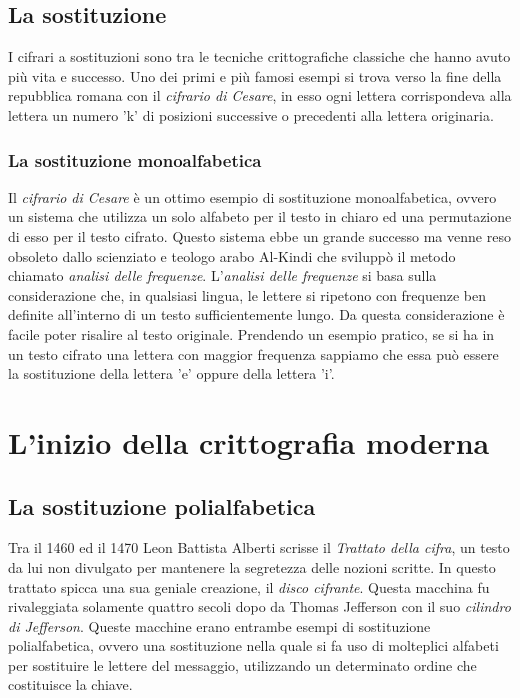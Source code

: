 \documentclass[a4paper, 12pt]{article}
\begin{document}
\subsection{La sostituzione}
I cifrari a sostituzioni sono tra le tecniche crittografiche classiche che hanno avuto più vita e successo. Uno dei primi e più famosi esempi si trova verso la fine della repubblica romana con il \textit{cifrario di Cesare}, in esso ogni lettera corrispondeva alla lettera un numero 'k' di posizioni successive o precedenti alla lettera originaria. 
\subsubsection{La sostituzione monoalfabetica}
Il \textit{cifrario di Cesare} è un ottimo esempio di sostituzione monoalfabetica, ovvero un sistema che utilizza un solo alfabeto per il testo in chiaro ed una permutazione di esso per il testo cifrato.\newline
Questo sistema ebbe un grande successo ma venne reso obsoleto dallo scienziato e teologo arabo Al-Kindi che sviluppò il metodo chiamato \textit{analisi delle frequenze}.\newline
L'\textit{analisi delle frequenze} si basa sulla considerazione che, in qualsiasi lingua, le lettere si ripetono con frequenze ben definite all'interno di un testo sufficientemente lungo. Da questa considerazione è facile poter risalire al testo originale. Prendendo un esempio pratico, se si ha in un testo cifrato una lettera con maggior frequenza sappiamo che essa può essere la sostituzione della lettera 'e' oppure della lettera 'i'.
\section{L'inizio della crittografia moderna}
\subsection{La sostituzione polialfabetica}
Tra il 1460 ed il 1470 Leon Battista Alberti scrisse il \textit{Trattato della cifra}, un testo da lui non divulgato per mantenere la segretezza delle nozioni scritte. In questo trattato spicca una sua geniale creazione, il \textit{disco cifrante}. Questa macchina fu rivaleggiata solamente quattro secoli dopo da Thomas Jefferson con il suo \textit{cilindro di Jefferson}.
Queste macchine erano entrambe esempi di sostituzione polialfabetica, ovvero una sostituzione nella quale si fa uso di molteplici alfabeti per sostituire le lettere del messaggio, utilizzando un determinato ordine che costituisce la chiave.
\end{document}
